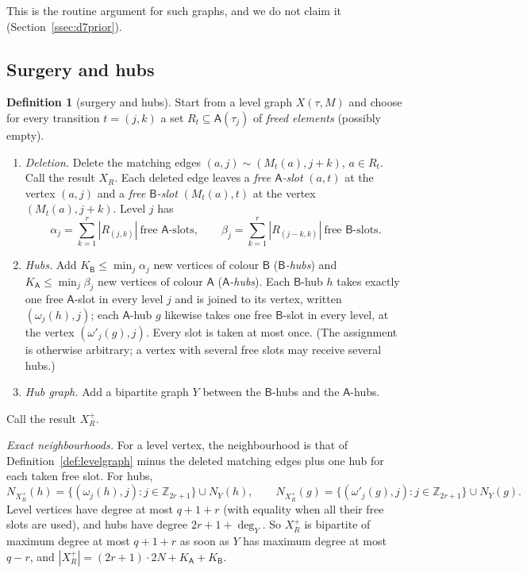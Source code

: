 \documentclass[11pt]{amsart}
\theoremstyle{definition}
\newtheorem{definition}[theorem]{Definition}
\theoremstyle{remark}
\numberwithin{equation}{section}
\newcommand{\Z}{\mathbb Z}
\begin{document}
This is the routine argument for such graphs, and we do not claim it (Section~\ref{ssec:d7prior}).

\subsection{Surgery and hubs}

\begin{definition}[surgery and hubs]\label{def:surgery}
Start from a level graph $X(\tau,M)$ and choose for every transition $t=(j,k)$ a set $R_t\subseteq\mathsf A(\tau_j)$ of
\emph{freed elements} (possibly empty).
\begin{enumerate}
\item \emph{Deletion.} Delete the matching edges $(a,j)\sim(M_t(a),j+k)$, $a\in R_t$. Call the result $X_R$. Each deleted
  edge leaves a \emph{free $\mathsf A$-slot} $(a,t)$ at the vertex $(a,j)$ and a \emph{free $\mathsf B$-slot} $(M_t(a),t)$
  at the vertex $(M_t(a),j+k)$. Level $j$ has
  \[
  \alpha_j=\sum_{k=1}^r|R_{(j,k)}|\ \text{free }\mathsf A\text{-slots},\qquad \beta_j=\sum_{k=1}^r|R_{(j-k,k)}|\ \text{free
  }\mathsf B\text{-slots}.
  \]
\item \emph{Hubs.} Add $K_{\mathsf B}\le\min_j\alpha_j$ new vertices of colour $\mathsf B$ (\emph{$\mathsf B$-hubs}) and
  $K_{\mathsf A}\le\min_j\beta_j$ new vertices of colour $\mathsf A$ (\emph{$\mathsf A$-hubs}). Each $\mathsf B$-hub $h$ takes
  exactly one free $\mathsf A$-slot in every level $j$ and is joined to its vertex, written $(\omega_j(h),j)$; each
  $\mathsf A$-hub $g$ likewise takes one free $\mathsf B$-slot in every level, at the vertex $(\omega'_j(g),j)$. Every slot is
  taken at most once. (The assignment is otherwise arbitrary; a vertex with several free slots may receive several hubs.)
\item \emph{Hub graph.} Add a bipartite graph $Y$ between the $\mathsf B$-hubs and the $\mathsf A$-hubs.
\end{enumerate}
Call the result $X^+_R$.
\end{definition}

\emph{Exact neighbourhoods.} For a level vertex, the neighbourhood is that of Definition~\ref{def:levelgraph} minus the
deleted matching edges plus one hub for each taken free slot. For hubs,
\[
N_{X^+_R}(h)=\{(\omega_j(h),j):j\in\Z_{2r+1}\}\cup N_Y(h),\qquad N_{X^+_R}(g)=\{(\omega'_j(g),j):j\in\Z_{2r+1}\}\cup N_Y(g).
\]
Level vertices have degree at most $q+1+r$ (with equality when all their free slots are used), and hubs have degree
$2r+1+\deg_Y$. So $X^+_R$ is bipartite of maximum degree at most $q+1+r$ as soon as $Y$ has maximum degree at most $q-r$,
and $|X^+_R|=(2r+1)\cdot2N+K_{\mathsf A}+K_{\mathsf B}$.
\end{document}
